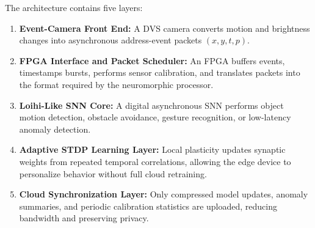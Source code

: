 \documentclass[11pt]{article}
\begin{document}
The architecture contains five layers:
\begin{enumerate}
    \item \textbf{Event-Camera Front End:} A DVS camera converts motion and brightness changes into asynchronous address-event packets $(x,y,t,p)$.
    \item \textbf{FPGA Interface and Packet Scheduler:} An FPGA buffers events, timestamps bursts, performs sensor calibration, and translates packets into the format required by the neuromorphic processor.
    \item \textbf{Loihi-Like SNN Core:} A digital asynchronous SNN performs object motion detection, obstacle avoidance, gesture recognition, or low-latency anomaly detection.
    \item \textbf{Adaptive STDP Learning Layer:} Local plasticity updates synaptic weights from repeated temporal correlations, allowing the edge device to personalize behavior without full cloud retraining.
    \item \textbf{Cloud Synchronization Layer:} Only compressed model updates, anomaly summaries, and periodic calibration statistics are uploaded, reducing bandwidth and preserving privacy.
\end{enumerate}
\end{document}
